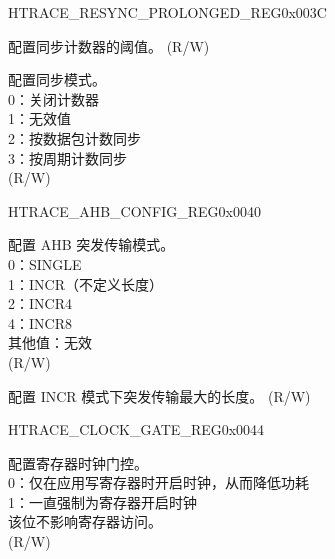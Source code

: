 \begin{register}{H}{TRACE\_RESYNC\_PROLONGED\_REG}{0x003C}\label{regdesc:TRACERESYNCPROLONGEDREG}
%
%
%
\regnewline%
\begin{regdesc}\begin{reglist}
\label{fielddesc:TRACERESYNCPROLONGED}\item [TRACE\_RESYNC\_PROLONGED] 配置同步计数器的阈值。 (R/W)
\label{fielddesc:TRACERESYNCMODE}\item [TRACE\_RESYNC\_MODE] 配置同步模式。\\
0：关闭计数器\\
1：无效值\\
2：按数据包计数同步\\
3：按周期计数同步\\ (R/W)
\end{reglist}\end{regdesc}
\end{register}


\begin{register}{H}{TRACE\_AHB\_CONFIG\_REG}{0x0040}\label{regdesc:TRACEAHBCONFIGREG}
%
%
%
\regnewline%
\begin{regdesc}\begin{reglist}
\label{fielddesc:TRACEHBURST}\item [TRACE\_HBURST] 配置 AHB 突发传输模式。\\
0：SINGLE\\
1：INCR（不定义长度）\\
2：INCR4\\
4：INCR8\\
其他值：无效\\ (R/W)
\label{fielddesc:TRACEMAXINCR}\item [TRACE\_MAX\_INCR] 配置 INCR 模式下突发传输最大的长度。 (R/W)
\end{reglist}\end{regdesc}
\end{register}


\begin{register}{H}{TRACE\_CLOCK\_GATE\_REG}{0x0044}\label{regdesc:TRACECLOCKGATEREG}
%
%
\regnewline%
\begin{regdesc}\begin{reglist}
\label{fielddesc:TRACECLKEN}\item [TRACE\_CLK\_EN] 配置寄存器时钟门控。\\
0：仅在应用写寄存器时开启时钟，从而降低功耗\\
1：一直强制为寄存器开启时钟\\
该位不影响寄存器访问。\\ (R/W)
\end{reglist}\end{regdesc}
\end{register}


